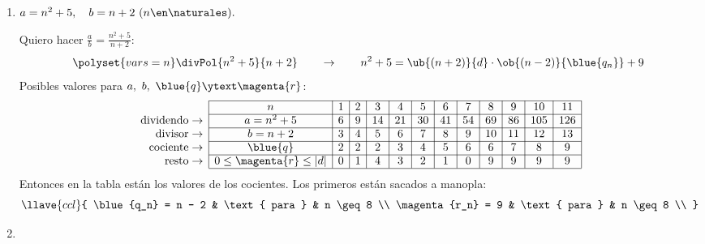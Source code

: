 \begin{enumerate}[label=\alph*)]
  \item $a = n^2 + 5,\quad b = n + 2 \ (n \en \naturales).$

        Quiero hacer $\frac{a}{b} = \frac{n^2 + 5}{n + 2}$:
        $$
          \polyset{vars=n}
          \divPol{n^2 + 5}{n + 2}
          \qquad \to \qquad
          n^2 + 5 = \ub{(n + 2)}{d} \cdot \ob{(n - 2)}{\blue{q_n}} + 9
        $$
        Posibles valores para $a,\ b,\ \blue{q} \ytext \magenta{r}$:
        $$
          \begin{array}{r|c|c|c|c|c|c|c|c|c|c|c|c|c|c} \cline{2-13}
                                & n                           & 1 & 2 & 3  & 4  & 5  & 6  & 7  & 8  & 9  & 10  & 11  \\ \cline{2-13}
            \text{dividendo}\to & a = n^2 + 5                 & 6 & 9 & 14 & 21 & 30 & 41 & 54 & 69 & 86 & 105 & 126 \\ \cline{2-13}
            \text{divisor}  \to & b = n + 2                   & 3 & 4 & 5  & 6  & 7  & 8  & 9  & 10 & 11 & 12  & 13  \\ \cline{2-13}
            \text{cociente} \to & \blue{q}                    & 2 & 2 & 2  & 3  & 4  & 5  & 6  & 6  & 7  & 8   & 9   \\ \cline{2-13}
            \text{resto}    \to & 0 \leq \magenta{r} \leq |d| & 0 & 1 & 4  & 3  & 2  & 1  & 0  & 9  & 9  & 9   & 9   \\ \cline{2-13}
          \end{array}
        $$
        Entonces en la tabla están los valores de los cocientes. Los primeros están sacados a manopla:
        $$
          \llave{ccl}{
            \blue{q_n} = n - 2 & \text{ para } & n \geq 8 \\
            \magenta{r_n} = 9 & \text{ para } & n \geq 8 \\
          }
        $$

  \item \hacer
\end{enumerate}

\begin{aportes}
  \item {}
\end{aportes}

